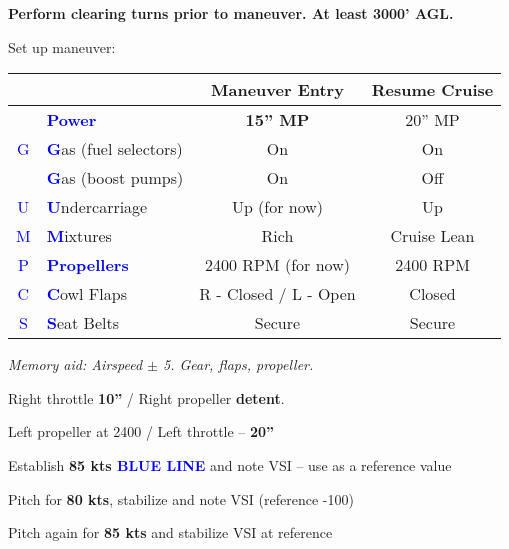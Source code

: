 \textbf{Perform clearing turns prior to maneuver. At least 3000' AGL.}

Set up maneuver:

\begin{table}[H]
\centering
\begin{tabular}{|c|l|c|c|}
\hline
                    &                                                 & \textbf{Maneuver Entry} & \textbf{Resume Cruise} \\ \hline
                    & \textcolor{blue}{\textbf{Power}}                & \textbf{15'' MP}        & 20'' MP                \\ \hline
\textcolor{blue}{G} & \textcolor{blue}{\textbf{G}}as (fuel selectors) & On                      & On                     \\
                    & \textcolor{blue}{\textbf{G}}as (boost pumps)    & On                      & Off                    \\ \hline
\textcolor{blue}{U} & \textcolor{blue}{\textbf{U}}ndercarriage        & Up (for now)            & Up                     \\ \hline
\textcolor{blue}{M} & \textcolor{blue}{\textbf{M}}ixtures             & Rich                    & Cruise Lean            \\ \hline
\textcolor{blue}{P} & \textcolor{blue}{\textbf{Propellers}}           & 2400 RPM (for now)      & 2400 RPM               \\ \hline
\textcolor{blue}{C} & \textcolor{blue}{\textbf{C}}owl Flaps           & R - Closed / L - Open   & Closed                 \\ \hline
\textcolor{blue}{S} & \textcolor{blue}{\textbf{S}}eat Belts           & Secure                  & Secure                 \\ \hline
\end{tabular}
\end{table}

\emph{Memory aid: Airspeed $\pm$ 5. Gear, flaps, propeller.}

Right throttle \textbf{10''} / Right propeller \textbf{detent}.

Left propeller at 2400 / Left throttle – \textbf{20''}

Establish \vyse \textbf{85 kts \textcolor{blue}{BLUE LINE}} and note VSI – use as a reference value

Pitch for \textbf{80 kts}, stabilize and note VSI (reference -100)

Pitch again for \textbf{85 kts} and stabilize VSI at reference

